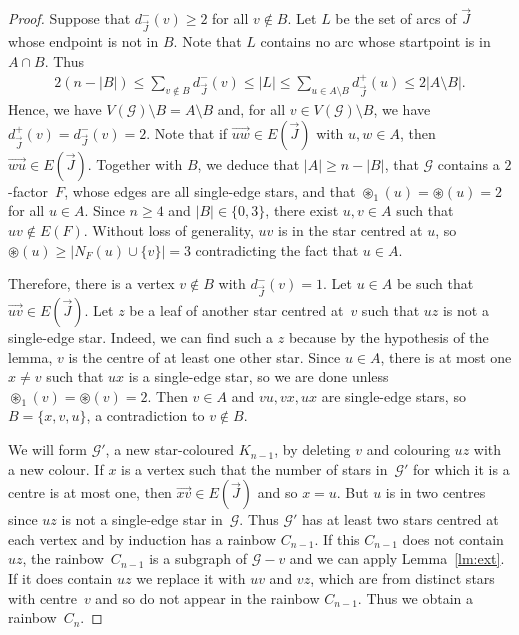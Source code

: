 \documentclass[10pt,a4paper]{amsart}
\def\cen{\circledast}
\newcommand{\ms}[1]{\mathscr{#1}}
\newcommand{\ova}[1]{\overrightarrow{#1}}
\begin{document}
\begin{proof}
    Suppose that $d^-_{\ova{J}}(v) \geq 2$ for all $v \notin B$.
    Let $L$ be the set of arcs of $\ova{J}$ whose endpoint is not in $B$. Note that $L$ contains no arc whose startpoint is in $A \cap B$. 
    Thus
    \begin{align*}
        2(n - |B|) \le \sum_{v \notin B} d^-_{\ova{J}}(v) \le 
        |L| \le \sum_{u \in A \setminus B} d^+_{\ova{J}}(u) \le 2 |A \setminus B|.
    \end{align*}
    Hence, we have $V(\ms{G}) \setminus B = A \setminus B$ and, for all $v \in V(\ms{G}) \setminus B$, we have $d^+_{\ova{J}}(v) = d^-_{\ova{J}}(v) = 2$. 
    Note that if $\ova{u w} \in E( \ova{J} )$ with $u,w \in A$, then $\ova{w u} \in E( \ova{J})$.
    Together with $B$, we deduce that $|A| \ge n- |B|$,  that $\ms{G}$ contains a $2$-factor~$F$, whose edges are all single-edge stars, and that $\cen_1( u ) = \cen( u ) = 2$ for all $u \in A$.
    Since $n \ge 4$ and $|B| \in \{0,3\}$, there exist $u,v \in A$ such that $uv \notin E(F)$. 
    Without loss of generality, $uv$ is in the star centred at $u$, so $\cen( u ) \ge |N_F(u) \cup \{v\}| = 3$ contradicting the fact that $u \in A$. 
    
        
    Therefore, there is a vertex $v \notin B$ with $d^-_{\ova{J}}(v)=1$.
    Let $u \in A$ be such that $\ova{uv} \in E(\ova{J})$.
    Let $z$ be a leaf of another star centred at~$v$ such that $uz$ is not a single-edge star.
    Indeed, we can find such a $z$ because by the hypothesis of the lemma, $v$ is the centre of at least one other star.
    Since $u \in A$, there is at most one $x \neq v$ such that $ux$ is a single-edge star, so we are done unless $\cen_1(v) = \cen(v) = 2$.
     Then $v \in A$ and $vu,vx,ux$ are single-edge stars, so $B = \{x,v,u\}$, a contradiction to $v \notin B$.

    We will form $\ms{G}'$, a new star-coloured $K_{n-1}$, by deleting $v$ and colouring $uz$ with a new colour. 
    If $x$ is a vertex such that the number of stars in~$\ms{G}'$ for which it is a centre is at most one, then $\ova{xv} \in E(\ova{J})$ and so $x=u$.
    But $u$ is in two centres since $uz$ is not a single-edge star in~$\ms{G}$.
    Thus $\ms{G}'$ has at least two stars centred at each vertex and by induction has a rainbow $C_{n-1}$.
    If this $C_{n-1}$ does not contain~$uz$, the rainbow~$C_{n-1}$ is a subgraph of $\ms{G}-v$ and we can apply Lemma~\ref{lm:ext}.
    If it does contain $uz$ we replace it with $uv$ and $vz$, which are from distinct stars with centre~$v$ and so do not appear in the rainbow $C_{n-1}$. 
    Thus we obtain a rainbow~$C_n$.
\end{proof}
\end{document}
